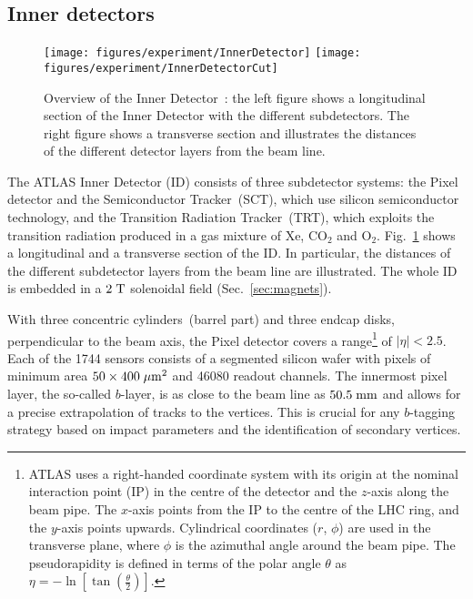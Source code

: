 \subsection{Inner detectors}
\label{sec:ID}

\begin{figure}[h]
\centering
\texttt{[image: figures/experiment/InnerDetector]}
\texttt{[image: figures/experiment/InnerDetectorCut]}
\caption[Overview of the Inner Detector]{
  Overview of the Inner Detector~\cite{detectorpaper}:
  the left figure shows a longitudinal section of the Inner Detector with the different subdetectors.
  The right figure shows a transverse section and illustrates the distances of the different detector layers from the beam line.}
\label{fig:ID}
\end{figure}

The ATLAS Inner Detector (ID) consists of three subdetector systems:
the Pixel detector and the Semiconductor Tracker~(SCT), which use silicon semiconductor
technology, and the Transition Radiation Tracker~(TRT), which exploits the transition radiation produced in a gas mixture of Xe, CO$_2$ and O$_2$.
Fig.~\ref{fig:ID} shows a longitudinal and a transverse section of the ID.
In particular, the distances of the different subdetector layers from the beam line are illustrated.
The whole ID is embedded in a \mbox{$2 \; \mathrm{T}$} solenoidal field (Sec.~\ref{sec:magnets}).

With three concentric cylinders~(barrel part) and  three endcap disks, perpendicular to the beam axis, the Pixel detector
covers a range\footnote{ATLAS uses a right-handed coordinate system with its origin at the nominal interaction point (IP) in the centre
  of the detector and the $z$-axis along the beam pipe. The $x$-axis points from the IP to the centre of the LHC ring, and the $y$-axis points
  upwards. Cylindrical coordinates ($r$, $\phi$) are used in the transverse plane, where $\phi$ is the azimuthal angle around the beam pipe. The
  pseudorapidity is defined in terms of the polar angle $\theta$ as \mbox{$\eta = - \ln \left[ \tan \left( \frac{\theta}{2} \right) \right]$}.} of
\mbox{$|\eta| < 2.5$}.
Each of the 1744 sensors consists of a segmented silicon wafer with pixels of minimum area \mbox{$50 \times 400 \; \mu\mathrm{m}^2$} and 46080 readout channels.
The innermost pixel layer, the so-called $b$-layer, is as close to the beam line as \mbox{$50.5 \; \mathrm{mm}$} and allows for a precise extrapolation of tracks
to the vertices.
This is crucial for any $b$-tagging strategy based on impact parameters and the identification of secondary vertices.

